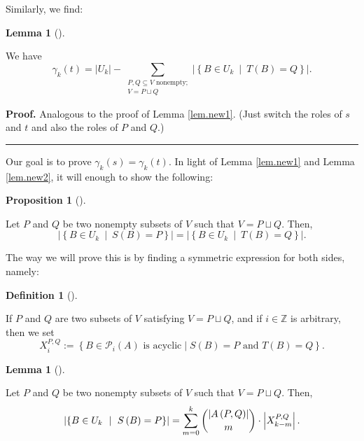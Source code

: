 \documentclass[numbers=enddot,12pt,final,onecolumn,notitlepage]{scrartcl}%
\theoremstyle{definition}
\newtheorem{lem}[theo]{Lemma}
\newenvironment{lemma}[1][]
{\begin{lem}[#1]\begin{leftbar}}
{\end{leftbar}\end{lem}}
\newtheorem{prop}[theo]{Proposition}
\newenvironment{proposition}[1][]
{\begin{prop}[#1]\begin{leftbar}}
{\end{leftbar}\end{prop}}
\newtheorem{defi}[theo]{Definition}
\newenvironment{definition}[1][]
{\begin{defi}[#1]\begin{leftbar}}
{\end{leftbar}\end{defi}}
\newenvironment{proof}[1][Proof]{\noindent\textbf{#1.} }{\ \rule{0.5em}{0.5em}}
\let\sumnonlimits\sum
\renewcommand{\sum}{\sumnonlimits\limits}
\theoremstyle{plainsl}
\begin{document}
Similarly, we find:

\begin{lemma}
\label{lem.new2}We have%
\[
\gamma_{k}\left(  t\right)  =\left\vert U_{k}\right\vert -\sum
_{\substack{P,Q\subseteq V\text{ nonempty;}\\V=P\sqcup Q}}\left\vert \left\{
B\in U_{k}\ \mid\ T\left(  B\right)  =Q\right\}  \right\vert .
\]

\end{lemma}

\begin{proof}
Analogous to the proof of Lemma \ref{lem.new1}. (Just switch the roles of $s$
and $t$ and also the roles of $P$ and $Q$.)
\end{proof}

Our goal is to prove $\gamma_{k}\left(  s\right)  =\gamma_{k}\left(  t\right)
$. In light of Lemma \ref{lem.new1} and Lemma \ref{lem.new2}, it will enough
to show the following:

\begin{proposition}
\label{prop.new3}Let $P$ and $Q$ be two nonempty subsets of $V$ such that
$V=P\sqcup Q$. Then,%
\[
\left\vert \left\{  B\in U_{k}\ \mid\ S\left(  B\right)  =P\right\}
\right\vert =\left\vert \left\{  B\in U_{k}\ \mid\ T\left(  B\right)
=Q\right\}  \right\vert .
\]

\end{proposition}

The way we will prove this is by finding a symmetric expression for both
sides, namely:

\begin{definition}
If $P$ and $Q$ are two subsets of $V$ satisfying $V=P\sqcup Q$, and if
$i\in\mathbb{Z}$ is arbitrary, then we set%
\[
X_{i}^{P,Q}:=\left\{  B\in\mathcal{P}_{i}(A)\text{ is acyclic}\mid
S(B)=P\text{ and }T(B)=Q\right\}  .
\]

\end{definition}

\begin{lemma}
\label{lem.new4}Let $P$ and $Q$ be two nonempty subsets of $V$ such that
$V=P\sqcup Q$. Then,%
\[
\left\vert \left\{  B\in U_{k}\ \mid\ S\left(  B\right)  =P\right\}
\right\vert =\sum_{m=0}^{k}\dbinom{\left\vert A\left(  P,Q\right)  \right\vert
}{m}\cdot\left\vert X_{k-m}^{P,Q}\right\vert .
\]

\end{lemma}
\end{document}
